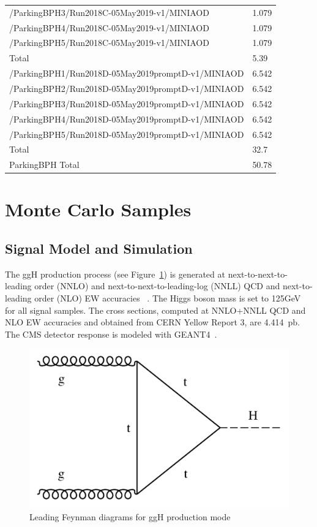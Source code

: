 \begin{table}[htb!]
\begin{center}
\begin{tabular}{l|l}
      /ParkingBPH3/Run2018C-05May2019-v1/MINIAOD  & 1.079 \\
      /ParkingBPH4/Run2018C-05May2019-v1/MINIAOD  & 1.079 \\
      /ParkingBPH5/Run2018C-05May2019-v1/MINIAOD  & 1.079 \\
      Total & 5.39\\
      \hline
      /ParkingBPH1/Run2018D-05May2019promptD-v1/MINIAOD  & 6.542 \\
      /ParkingBPH2/Run2018D-05May2019promptD-v1/MINIAOD  & 6.542 \\
      /ParkingBPH3/Run2018D-05May2019promptD-v1/MINIAOD  & 6.542 \\
      /ParkingBPH4/Run2018D-05May2019promptD-v1/MINIAOD  & 6.542 \\
      /ParkingBPH5/Run2018D-05May2019promptD-v1/MINIAOD  & 6.542 \\
      Total & 32.7\\
      \hline
      ParkingBPH Total & 50.78 \\
      \hline
    \end{tabular}
    \label{tab:datasample2018BPH}
  \end{center}
\end{table}




\section{Monte Carlo Samples}

\subsection{Signal Model and Simulation}

The ggH production process (see Figure~\ref{fig:feynmanggH}) is generated at next-to-next-to-leading order (NNLO) and next-to-next-to-leading-log (NNLL) QCD and next-to-leading order (NLO) EW accuracies ~\cite{Heinemeyer:2013xd}.
The Higgs boson mass is set to 125GeV for all signal samples.
The cross sections, computed at NNLO+NNLL QCD and NLO EW accuracies and obtained from CERN Yellow Report 3,
are 4.414~$\mathrm{pb}$. The CMS detector response is modeled with GEANT4~\cite{Agostinelli:2002hh}.

\begin{figure}[h!]
  \caption{Leading Feynman diagrams for ggH production mode}
  \label{fig:feynmanggH}
  \centering
  \includegraphics[width=0.47\linewidth]{figs/feynmanggH.pdf}

\end{figure}


